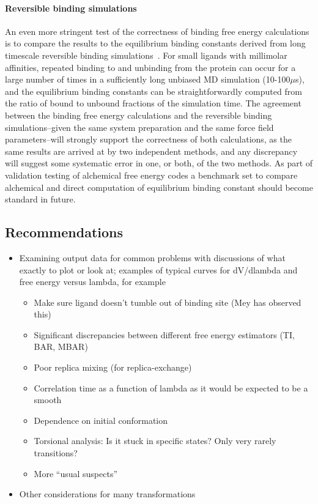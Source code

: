 \documentclass[9pt,bestpractices]{livecoms}
\begin{document}
\paragraph{Reversible binding simulations}
An even more stringent test of the correctness of binding free energy calculations is to compare the results to the equilibrium binding constants derived from long timescale reversible binding simulations~\cite{pan2017quantitative}.  For small ligands with millimolar affinities, repeated binding to and unbinding from the protein can occur for a large number of times in a sufficiently long unbiased MD simulation (10-100$\mu$s), and the equilibrium binding constants can be straightforwardly computed from the ratio of bound to unbound fractions of the simulation time. The agreement between the binding free energy calculations and the reversible binding simulations--given the same system preparation and the same force field parameters--will strongly support the correctness of both calculations, as the same results are arrived at by two independent methods, and any discrepancy will suggest some systematic error in one, or both, of the two methods. As part of validation testing of alchemical free energy codes a benchmark set to compare alchemical and direct computation of equilibrium binding constant should become standard in future.
%
\subsection{Recommendations}
\begin{itemize}
\item Examining output data for common problems with discussions of what exactly to plot or look at; examples of typical curves for dV/dlambda and free energy versus lambda, for example
\begin{itemize}
\item Make sure ligand doesn’t tumble out of binding site (Mey has observed this)
\item Significant discrepancies between different free energy estimators (TI, BAR, MBAR)
\item Poor replica mixing (for replica-exchange)
\item Correlation time as a function of lambda as it would be expected to be a smooth
\item Dependence on initial conformation
\item Torsional analysis: Is it stuck in specific states? Only very rarely transitions?
\item More “usual suspects”
\end{itemize}
\item Other considerations for many transformations
\end{itemize}
%
\end{document}
